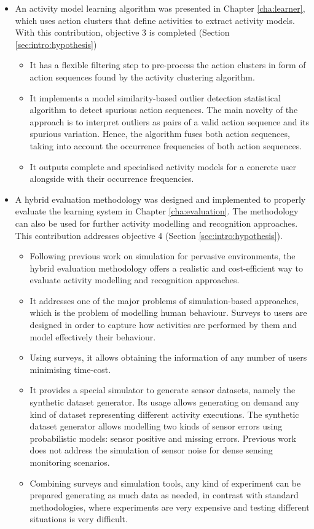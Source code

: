 \begin{itemize}
 \item An activity model learning algorithm was presented in Chapter \ref{cha:learner}, which uses action clusters that define activities to extract activity models. With this contribution, objective 3 is completed (Section \ref{sec:intro:hypothesis})  %
 \begin{itemize}
  \item It has a flexible filtering step to pre-process the action clusters in form of action sequences found by the activity clustering algorithm.
  \item It implements a model similarity-based outlier detection statistical algorithm to detect spurious action sequences. The main novelty of the approach is to interpret outliers as pairs of a valid action sequence and its spurious variation. Hence, the algorithm fuses both action sequences, taking into account the occurrence frequencies of both action sequences.
  \item It outputs complete and specialised activity models for a concrete user alongside with their occurrence frequencies.
 \end{itemize}

 \item A hybrid evaluation methodology was designed and implemented to properly evaluate the learning system in Chapter \ref{cha:evaluation}. The methodology can also be used for further activity modelling and recognition approaches. This contribution addresses objective 4 (Section \ref{sec:intro:hypothesis}). %
 \begin{itemize}
  \item Following previous work on simulation for pervasive environments, the hybrid evaluation methodology offers a realistic and cost-efficient way to evaluate activity modelling and recognition approaches.
  \item It addresses one of the major problems of simulation-based approaches, which is the problem of modelling human behaviour. Surveys to users are designed in order to capture how activities are performed by them and model effectively their behaviour.
  \item Using surveys, it allows obtaining the information of any number of users minimising time-cost.
  \item It provides a special simulator to generate sensor datasets, namely the synthetic dataset generator. Its usage allows generating on demand any kind of dataset representing different activity executions. The synthetic dataset generator allows modelling two kinds of sensor errors using probabilistic models: sensor positive and missing errors. Previous work does not address the simulation of sensor noise for dense sensing monitoring scenarios.
  \item Combining surveys and simulation tools, any kind of experiment can be prepared generating as much data as needed, in contrast with standard methodologies, where experiments are very expensive and testing different situations is very difficult.
 \end{itemize}

\end{itemize}
